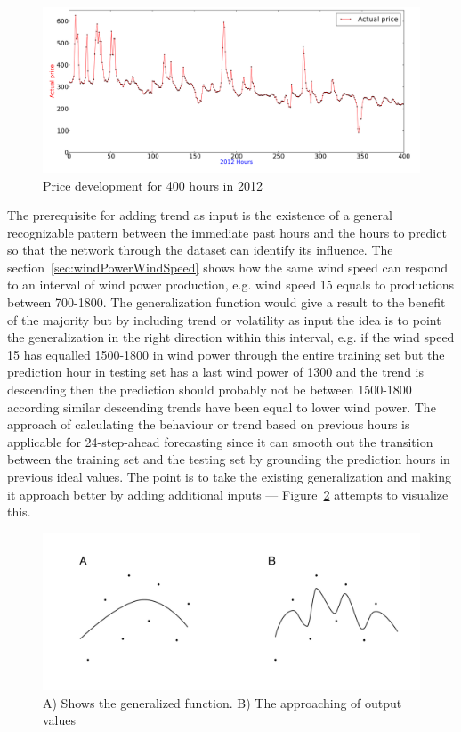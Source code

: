 \begin{figure}[H]
\centering
\includegraphics[width=0.99\linewidth,natwidth=898,natheight=587]{billeder/priceGraph400.png}
\caption{Price development for 400 hours in 2012}
\label{fig:priceHourDevelopment400HoursStatistics}
\end{figure}

The prerequisite for adding trend as input is the existence of a general recognizable pattern between the immediate past hours and the hours to predict so that the network through the dataset can identify its influence. The section~\ref{sec:windPowerWindSpeed} shows how the same wind speed can respond to an interval of wind power production, e.g. wind speed 15 equals to productions between 700-1800. The generalization function would give a result to the benefit of the majority but by including trend or volatility as input the idea is to point the generalization in the right direction within this interval, e.g. if the wind speed 15 has equalled 1500-1800 in wind power through the entire training set but the prediction hour in testing set has a last wind power of 1300 and the trend is descending then the prediction should probably not be between 1500-1800 according similar descending trends have been equal to lower wind power. The approach of calculating the behaviour or trend based on previous hours is applicable for 24-step-ahead forecasting since it can smooth out the transition between the training set and the testing set by grounding the prediction hours in previous ideal values. The point is to take the existing generalization and making it approach better by adding additional inputs --- Figure~\ref{fig:WP} attempts to visualize this. 

\begin{figure}[H]
\centering
\includegraphics[width=0.99\linewidth,natwidth=898,natheight=587]{billeder/WP_000057.jpg}
\caption{A) Shows the generalized function. B) The approaching of output values}
\label{fig:WP}
\end{figure}

